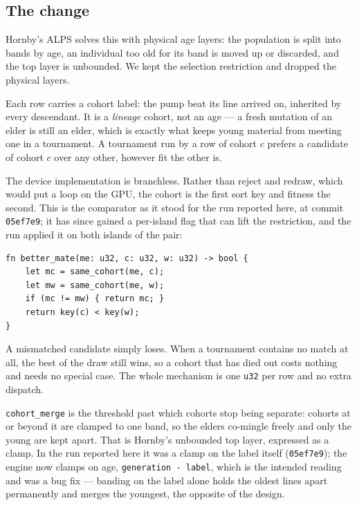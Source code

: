 \documentclass[11pt,a4paper]{article}
\begin{document}
\subsection{The change}

Hornby's ALPS solves this with physical age layers: the population is split into
bands by age, an individual too old for its band is moved up or discarded, and
the top layer is unbounded. We kept the selection restriction and dropped the
physical layers.

Each row carries a cohort label: the pump beat its line arrived on, inherited by
every descendant. It is a \emph{lineage} cohort, not an age --- a fresh mutation
of an elder is still an elder, which is exactly what keeps young material from
meeting one in a tournament. A tournament run by a row of cohort $c$ prefers a
candidate of cohort $c$ over any other, however fit the other is.

The device implementation is branchless. Rather than reject and redraw, which
would put a loop on the GPU, the cohort is the first sort key and fitness the
second. This is the comparator as it stood for the run reported here, at commit
\texttt{05ef7e9}; it has since gained a per-island flag that can lift the
restriction, and the run applied it on both islands of the pair:

\begin{verbatim}
fn better_mate(me: u32, c: u32, w: u32) -> bool {
    let mc = same_cohort(me, c);
    let mw = same_cohort(me, w);
    if (mc != mw) { return mc; }
    return key(c) < key(w);
}
\end{verbatim}

A mismatched candidate simply loses. When a tournament contains no match at all,
the best of the draw still wins, so a cohort that has died out costs nothing and
needs no special case. The whole mechanism is one \texttt{u32} per row and no
extra dispatch.

\texttt{cohort\_merge} is the threshold past which cohorts stop being separate:
cohorts at or beyond it are clamped to one band, so the elders co-mingle freely
and only the young are kept apart. That is Hornby's unbounded top layer,
expressed as a clamp. In the run reported here it was a clamp on the label
itself (\texttt{05ef7e9}); the engine now clamps on age, \texttt{generation -
label}, which is the intended reading and was a bug fix --- banding on the label
alone holds the oldest lines apart permanently and merges the youngest, the
opposite of the design.
\end{document}
